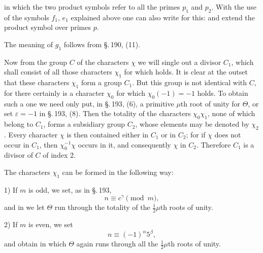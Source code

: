 in which the two product symbols refer to all the primes $p_1$ and
$p_2$. With the use of the symbols $f_1$, $e_1$ explained above one
can also write for this:
and extend the product symbol over  primes $p$.

The meaning of $g_1$ follows from \S.\,190, (11).

Now from the group $C$ of the characters $\chi$ we will single out a
divisor $C_1$, which shall consist of all those characters $\chi_1$
for which
holds. It is clear at the outset that these characters $\chi_1$ form
a group $C_1$. But this group is not identical with $C$, for there
certainly is a character $\chi_0$ for which $\chi_0(-1) = -1$
holds. To obtain such a one we need only put, in \S.\,193,
(6), a primitive $\mu$th root of unity for $\Theta$,
or set $\varepsilon = -1$ in \S.\,193, (8). Then the
totality of the characters $\chi_0\chi_1$, none of which belong to
$C_1$, forms a subsidiary group $C_2$, whose elements may be
denoted by $\chi_2$. Every character $\chi$ is then
contained either in $C_1$ or in $C_2$; for if $\chi$ does not
occur in $C_1$, then $\chi_0^{-1}\chi$ occurs in it, and
consequently $\chi$ in $C_2$. Therefore $C_1$ is a divisor of $C$
of index 2.

The characters $\chi_1$ can be formed in the following way:

1) If $m$ is odd, we set, as in \S.\,193,
\[ n \equiv c^{\gamma} \pmod{m}, \]
and in
we let $\Theta$ run through the totality of the $\tfrac12\mu$th
roots of unity.

2) If $m$ is even, we set
\[ n \equiv (-1)^{\alpha}5^{\beta}, \]
and obtain
in which $\Theta$ again runs through all the $\tfrac12\mu$th
roots of unity.
